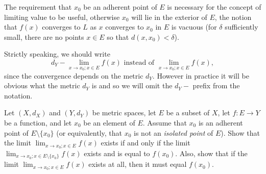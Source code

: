 \begin{remark}\label{3.1.7}
    The requirement that \(x_0\) be an adherent point of \(E\) is necessary for the concept of limiting value to be useful, otherwise \(x_0\) will lie in the exterior of \(E\), the notion that \(f(x)\) converges to \(L\) as \(x\) converges to \(x_0\) in \(E\) is vacuous
    (for \(\delta\) sufficiently small, there are no points \(x \in E\) so that \(d(x, x_0) < \delta\)).
\end{remark}

\begin{remark}\label{3.1.8}
    Strictly speaking, we should write
    \[
        d_Y - \lim_{x \to x_0 ; x \in E} f(x) \text{ instead of } \lim_{x \to x_0 ; x \in E} f(x),
    \]
    since the convergence depends on the metric \(d_Y\).
    However in practice it will be obvious what the metric \(d_Y\) is and so we will omit the \(d_Y -\) prefix from the notation.
\end{remark}

\exercisesection

\begin{exercise}\label{ex 3.1.1}
    Let \((X, d_X)\) and \((Y, d_Y)\) be metric spaces, let \(E\) be a subset of \(X\), let \(f : E \to Y\) be a function, and let \(x_0\) be an element of \(E\).
    Assume that \(x_0\) is an adherent point of \(E \setminus \{x_0\}\)
    (or equivalently, that \(x_0\) is not an \emph{isolated point} of \(E\)).
    Show that the limit \(\lim_{x \to x_0 ; x \in E} f(x)\) exists if and only if the limit \(\lim_{x \to x_0 ; x \in E \setminus \{x_0\}} f(x)\) exists and is equal to \(f(x_0)\).
    Also, show that if the limit \(\lim_{x \to x_0 ; x \in E} f(x)\) exists at all, then it must equal \(f(x_0)\).
\end{exercise}

